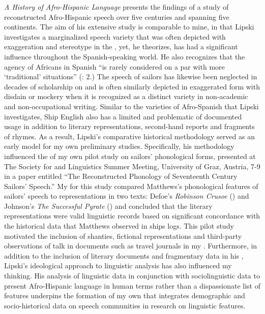  \textit{A History of Afro-Hispanic Language} presents the findings of a study of reconstructed Afro-Hispanic speech over five centuries and spanning five continents. The aim of his extensive study is comparable to mine, in that Lipski investigates a marginalized speech variety that was often depicted with exaggeration and stereotype in the , yet, he theorizes, has had a significant influence throughout the Spanish-speaking world. He also recognizes that the agency of Africans in Spanish  “is rarely considered on a par with more ‘traditional’  situations” (\citealt{Lipski2005}: 2.) The speech of sailors has likewise been neglected in decades of scholarship on  and is often similarly depicted in exaggerated form with disdain or mockery when it is recognized as a distinct variety in non-academic and non-occupational writing. Similar to the varieties of Afro-Spanish that Lipski investigates, Ship English also has a limited and problematic  of documented usage in addition to literary representations, second-hand reports and fragments of rhymes. As a result, Lipski’s comparative historical methodology served as an early model for my own preliminary studies. Specifically, his methodology influenced the  of my own pilot study on  sailors’ phonological forms, presented at The Society for  and  Linguistics Summer Meeting, University of Graz, Austria, 7-9 \citealt{July2015} in a paper entitled “The Reconstructed Phonology of Seventeenth Century Sailors’ Speech.” My  for this study compared Matthews’s phonological features of  sailors’ speech to representations in two texts: Defoe’s \textit{Robinson Crusoe} (\citeyear{Defoe1719}) and Johnson’s \textit{The Successful Pyrate} (\citeyear*{Johnson1713}) and concluded that the literary representations were valid linguistic records based on significant concordance with the historical data that Matthews observed in ships logs. This pilot study motivated the inclusion of shanties, fictional representations and third-party observations of  talk in documents such as travel journals in my . Furthermore, in addition to the inclusion of literary documents and fragmentary data in his , Lipski’s ideological approach to linguistic analysis has also influenced my thinking. His analysis of linguistic data in conjunction with sociolinguistic data to present Afro-Hispanic language in human terms rather than a dispassionate list of features underpins the formation of my own  that integrates demographic and socio-historical data on speech communities in research on linguistic features.

